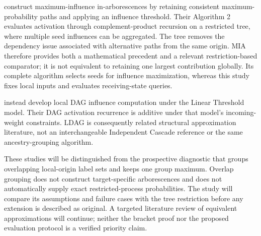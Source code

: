 \citet{chen2010mia} construct maximum-influence in-arborescences by retaining
consistent maximum-probability paths and applying an influence threshold.
Their Algorithm 2 evaluates activation through complement-product recursion
on a restricted tree, where multiple seed influences can be aggregated.
The tree removes the dependency issue associated with alternative paths
from the same origin. MIA therefore provides both a mathematical precedent
and a relevant restriction-based comparator; it is not equivalent to
retaining one largest contribution globally. Its complete algorithm selects
seeds for influence maximization, whereas this study fixes local inputs and
evaluates receiving-state queries.

\citet{chen2010ldag} instead develop local DAG influence computation under
the Linear Threshold model. Their DAG activation recurrence is additive
under that model's incoming-weight constraints. LDAG is consequently
related structural approximation literature, not an interchangeable
Independent Cascade reference or the same ancestry-grouping algorithm.

These studies will be distinguished from the prospective diagnostic that
groups overlapping local-origin label sets and keeps one group maximum.
Overlap grouping does not construct target-specific arborescences and does
not automatically supply exact restricted-process probabilities. The study
will compare its assumptions and failure cases with the tree restriction
before any extension is described as original. A targeted literature review
of equivalent approximations will continue; neither the bracket proof nor
the proposed evaluation protocol is a verified priority claim.
